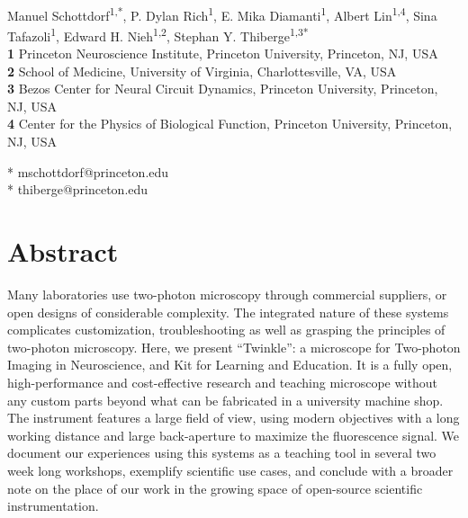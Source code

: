 \documentclass[10pt,letterpaper]{article}
\begin{document}
\vspace*{0.2in}

\begin{flushleft}
{\Large
\textbf{}
}
\newline
\\
Manuel Schottdorf\textsuperscript{1,*}, %
P. Dylan Rich\textsuperscript{1}, %
E. Mika Diamanti\textsuperscript{1}, %
Albert Lin\textsuperscript{1,4}, %
Sina Tafazoli\textsuperscript{1}, %
Edward H. Nieh\textsuperscript{1,2}, %
Stephan Y. Thiberge\textsuperscript{1,3*} %
\\
\bigskip
\textbf{1} Princeton Neuroscience Institute, Princeton University, Princeton, NJ, USA\\
\textbf{2} School of Medicine, University of Virginia, Charlottesville, VA, USA \\
\textbf{3} Bezos Center for Neural Circuit Dynamics, Princeton University, Princeton, NJ, USA\\
\textbf{4} Center for the Physics of Biological Function, Princeton University, Princeton, NJ, USA\\
\bigskip

* mschottdorf@princeton.edu\\
* thiberge@princeton.edu

\end{flushleft}
\section*{Abstract}
Many laboratories use two-photon microscopy through commercial suppliers, or open designs of considerable complexity. The integrated nature of these systems complicates customization, troubleshooting as well as grasping the principles of two-photon microscopy. Here, we present ``Twinkle'': a microscope for Two-photon Imaging in Neuroscience, and Kit for Learning and Education. It is a fully open, high-performance and cost-effective research and teaching microscope without any custom parts beyond what can be fabricated in a university machine shop. The instrument features a large field of view, using modern objectives with a long working distance and large back-aperture to maximize the fluorescence signal. We document our experiences using this systems as a teaching tool in several two week long workshops, exemplify scientific use cases, and conclude with a broader note on the place of our work in the growing space of open-source scientific instrumentation.
\end{document}
